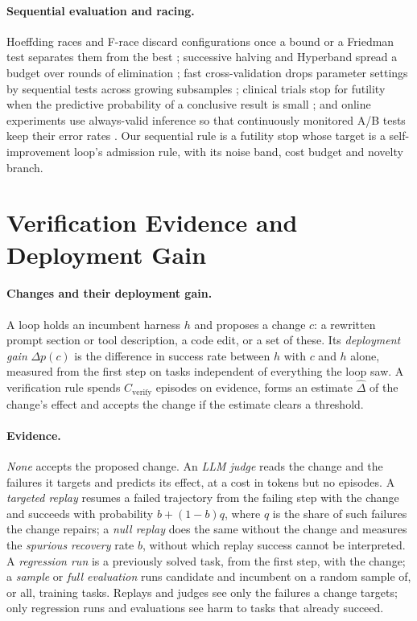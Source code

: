 \documentclass[11pt]{article}
\begin{document}
\paragraph{Sequential evaluation and racing.}
Hoeffding races and F-race discard configurations once a bound or a Friedman test separates them from the best \citep{maron1993hoeffding,birattari2002racing}; successive halving and Hyperband spread a budget over rounds of elimination \citep{jamieson2016successive,li2018hyperband}; fast cross-validation drops parameter settings by sequential tests across growing subsamples \citep{krueger2015fastcv}; clinical trials stop for futility when the predictive probability of a conclusive result is small \citep{spiegelhalter1986predictive}; and online experiments use always-valid inference so that continuously monitored A/B tests keep their error rates \citep{johari2017peeking}. Our sequential rule is a futility stop whose target is a self-improvement loop's admission rule, with its noise band, cost budget and novelty branch.

\section{Verification Evidence and Deployment Gain}
\label{sec:problem}

\paragraph{Changes and their deployment gain.} A loop holds an incumbent harness $h$ and proposes a change $c$: a rewritten prompt section or tool description, a code edit, or a set of these. Its \emph{deployment gain} $\Delta p(c)$ is the difference in success rate between $h$ with $c$ and $h$ alone, measured from the first step on tasks independent of everything the loop saw. A verification rule spends $C_{\mathrm{verify}}$ episodes on evidence, forms an estimate $\widehat{\Delta}$ of the change's effect and accepts the change if the estimate clears a threshold.

\paragraph{Evidence.} \emph{None} accepts the proposed change. An \emph{LLM judge} reads the change and the failures it targets and predicts its effect, at a cost in tokens but no episodes. A \emph{targeted replay} resumes a failed trajectory from the failing step with the change and succeeds with probability $b+(1-b)q$, where $q$ is the share of such failures the change repairs; a \emph{null replay} does the same without the change and measures the \emph{spurious recovery} rate $b$, without which replay success cannot be interpreted. A \emph{regression run} is a previously solved task, from the first step, with the change; a \emph{sample} or \emph{full evaluation} runs candidate and incumbent on a random sample of, or all, training tasks. Replays and judges see only the failures a change targets; only regression runs and evaluations see harm to tasks that already succeed.
\end{document}
